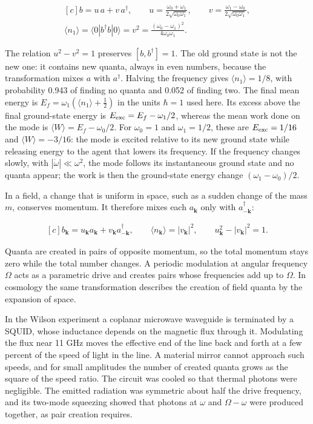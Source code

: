 \documentclass[11pt,oneside]{book}
\newenvironment{centeredalign}{\[\begin{gathered}[c]}{\end{gathered}\]}
\begin{document}
\begin{centeredalign}
b=u\,a+v\,a^\dagger,\qquad
u=\frac{\omega_0+\omega_1}{2\sqrt{\omega_0\omega_1}},\qquad
v=\frac{\omega_1-\omega_0}{2\sqrt{\omega_0\omega_1}},\\
\langle n_1\rangle=\langle0|b^\dagger b|0\rangle=v^2=\frac{(\omega_0-\omega_1)^2}{4\omega_0\omega_1}.
\end{centeredalign}

The relation \(u^2-v^2=1\) preserves \([b,b^\dagger]=1\). The old ground state is not the new one: it contains new quanta, always in even numbers, because the transformation mixes \(a\) with \(a^\dagger\). Halving the frequency gives \(\langle n_1\rangle=1/8\), with probability 0.943 of finding no quanta and 0.052 of finding two. The final mean energy is \(E_f=\omega_1(\langle n_1\rangle+\frac12)\) in the units \(\hbar=1\) used here. Its excess above the final ground-state energy is \(E_{\rm exc}=E_f-\omega_1/2\), whereas the mean work done on the mode is \(\langle W\rangle=E_f-\omega_0/2\). For \(\omega_0=1\) and \(\omega_1=1/2\), these are \(E_{\rm exc}=1/16\) and \(\langle W\rangle=-3/16\): the mode is excited relative to its new ground state while releasing energy to the agent that lowers its frequency. If the frequency changes slowly, with \(|\dot\omega|\ll\omega^2\), the mode follows its instantaneous ground state and no quanta appear; the work is then the ground-state energy change \((\omega_1-\omega_0)/2\).

In a field, a change that is uniform in space, such as a sudden change of the mass \(m\), conserves momentum. It therefore mixes each \(a_{\mathbf k}\) only with \(a_{-\mathbf k}^\dagger\):

\begin{centeredalign}
b_{\mathbf k}=u_{\mathbf k}a_{\mathbf k}+v_{\mathbf k}a_{-\mathbf k}^\dagger,\qquad
\langle n_{\mathbf k}\rangle=|v_{\mathbf k}|^2,\qquad
u_{\mathbf k}^2-|v_{\mathbf k}|^2=1.
\end{centeredalign}

Quanta are created in pairs of opposite momentum, so the total momentum stays zero while the total number changes. A periodic modulation at angular frequency \(\Omega\) acts as a parametric drive and creates pairs whose frequencies add up to \(\Omega\). In cosmology the same transformation describes the creation of field quanta by the expansion of space.

In the Wilson experiment a coplanar microwave waveguide is terminated by a SQUID, whose inductance depends on the magnetic flux through it. Modulating the flux near 11 GHz moves the effective end of the line back and forth at a few percent of the speed of light in the line. A material mirror cannot approach such speeds, and for small amplitudes the number of created quanta grows as the square of the speed ratio. The circuit was cooled so that thermal photons were negligible. The emitted radiation was symmetric about half the drive frequency, and its two-mode squeezing showed that photons at \(\omega\) and \(\Omega-\omega\) were produced together, as pair creation requires.
\end{document}
